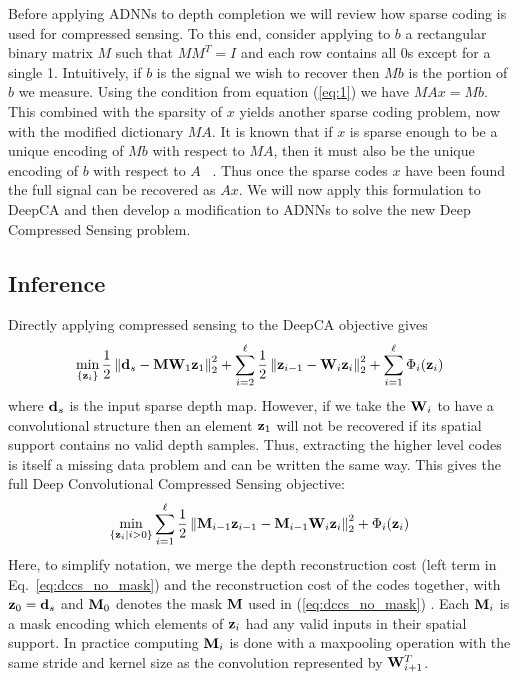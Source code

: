 Before applying ADNNs to depth completion we will review how sparse coding is used for compressed sensing. To this end, consider applying to $b$ a rectangular binary matrix $M$ such that $MM^T = I$ and each row contains all 0s except for a single 1. Intuitively, if $b$ is the signal we wish to recover then $Mb$ is the portion of $b$ we measure. Using the condition from equation (\ref{eq:1}) we have $MAx = Mb$. This combined with the sparsity of $x$ yields another sparse coding problem, now with the modified dictionary $MA$. It is known that if $x$ is sparse enough to be a unique encoding of $Mb$ with respect to $MA$, then it must also be the unique encoding of $b$ with respect to $A$ ~\cite{}. Thus once the sparse codes $x$ have been found the full signal can be recovered as $Ax$. We will now apply this formulation to DeepCA and then develop a modification to ADNNs to solve the new Deep Compressed Sensing problem.

\subsection{Inference}
\label{sec:deep-compr-sens}

Directly applying compressed sensing to the DeepCA objective gives
\begin{equation}
  \min_{\{\mathbf{z}_i\}} \frac{1}{2} \left\Vert \mathbf{d}_s - \mathbf{M}\mathbf{W}_1\mathbf{z}_1 \right\Vert_2^2  +  \sum_{i=2}^{\ell} \frac{1}{2} \left\Vert \mathbf{z}_{i-1} - \mathbf{W}_i\mathbf{z}_i\right\Vert_2^2 + \sum_{i=1}^{\ell}\Phi_i(\mathbf{z}_i) 
  \label{eq:dccs_no_mask}
\end{equation}
where $\mathbf{d}_s$ is the input sparse depth map. However, if we take the $\mathbf{W}_i$ to have a convolutional structure then an element $\mathbf{z}_1$ will not be recovered if its spatial support contains no valid depth samples. Thus, extracting the higher level codes is itself a missing data problem and can be written the same way. This gives the full Deep Convolutional Compressed Sensing objective:
\begin{equation}
  \label{eq:dccs}
  \min_{\{\mathbf{z}_i \vert i>0\}} \sum_{i=1}^{\ell} \frac{1}{2} \left\Vert \mathbf{M}_{i-1}\mathbf{z}_{i-1} - \mathbf{M}_{i-1}\mathbf{W}_i\mathbf{z}_i\right\Vert_2^2 + \Phi_i(\mathbf{z}_i)
\end{equation}
Here, to simplify notation, we merge the depth reconstruction cost (left term in Eq.~\ref{eq:dccs_no_mask}) and the reconstruction cost of the codes together, with $\mathbf{z}_0 = \mathbf{d}_s$ and $\mathbf{M}_0$ denotes the mask $\mathbf{M}$ used in (\ref{eq:dccs_no_mask}) . Each $\mathbf{M}_i$ is a mask encoding which elements of $\mathbf{z}_i$ had any valid inputs in their spatial support. In practice computing $\mathbf{M}_i$ is done with a maxpooling operation with the same stride and kernel size as the convolution represented by $\mathbf{W}_{i+1}^T$.\\

